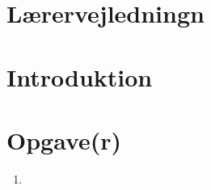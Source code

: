 \documentclass[a4paper,12pt]{article}
\title{\sbl}
\author{Jon Sporring}
\begin{document}
\maketitle

\section{Lærervejledningn}

\section{Introduktion}

\section{Opgave(r)}
\begin{enumerate}
\item 
\end{enumerate}
\end{document}
